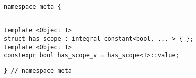 
\begin{verbatim}
namespace meta {
\end{verbatim}
\begin{verbatim}

template <Object T>
struct has_scope : integral_constant<bool, ... > { };
template <Object T>
constexpr bool has_scope_v = has_scope<T>::value;

\end{verbatim}
\begin{verbatim}
} // namespace meta
\end{verbatim}
